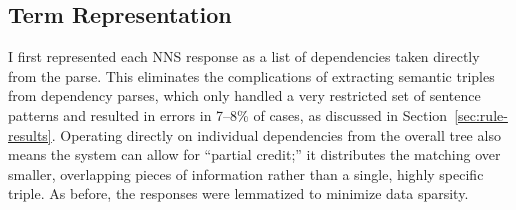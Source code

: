 \subsection{Term Representation}
\label{sec:response-rep}

I first represented each NNS response as a list of dependencies taken directly from the parse. 
This eliminates the complications of extracting semantic triples from
dependency parses, which only handled a very restricted set of
sentence patterns and resulted in errors in 7--8\% of cases, as discussed in Section~\ref{sec:rule-results}.
Operating directly on individual dependencies from the overall tree also means the system can allow for ``partial credit;'' it distributes the matching over smaller,
overlapping pieces of information rather than a single, highly specific triple. As before, the responses were lemmatized to minimize data sparsity.

